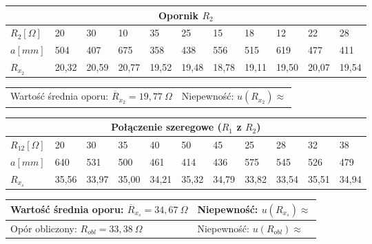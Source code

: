 \documentclass[a4paper,11pt]{article}
\begin{document}
\begin{table}[!ht]
\setlength{\extrarowheight}{5pt}
\centering
\begin{tabularx}{\textwidth}{XXXXXXXXXXX}

\multicolumn{11}{c}{\textbf{Opornik $R_2$}}\\        
\hline
$R_2[\Omega]$  &20	&30	&10	&35	&25	&15	&18	&12	&22	&28   \\
\hline
$a[mm]$  & 504 & 407 & 675 & 358 & 438 & 556 & 515 & 619	& 477 & 411 \\
\hline
$R_{x_2}$ &20,32 &20,59 &20,77 &19,52 &19,48 &18,78	&19,11	&19,50	&20,07	&19,54
\\    
\hline   
\end{tabularx}
\begin{tabularx}{\textwidth}{XX}
Wartość średnia oporu: $\overline{R}_{x_2}=19,77~\Omega $ & Niepewność: $u(R_{x_2})\approx $\\

\end{tabularx}
\end{table}


         
\begin{table}[!ht]
\setlength{\extrarowheight}{5pt}
\centering
\begin{tabularx}{\textwidth}{XXXXXXXXXXX}

\multicolumn{11}{c}{\textbf{Połączenie szeregowe ($R_1$ z $R_2$)}}\\        
\hline
$R_{12}[\Omega]$  & 20	&30	&35	&40	&50	&45	&25	&28	&32	&38 \\
\hline
$a[mm]$  & 640	&531 &500 &461 &414 &436 &575 &545 &526	&479 \\
\hline
$R_{x_s}$ & 35,56 & 33,97 & 35,00 & 34,21 & 35,32 & 34,79 & 33,82 & 33,54 & 35,51 & 34,94
\\    
\hline   
\end{tabularx}
\begin{tabularx}{\textwidth}{XX}
   
Wartość średnia oporu: $\overline{R}_{x_s}= 34,67~\Omega$ & Niepewność: $u(R_{x_s})\approx $ \\ \hline
Opór obliczony: $R_{obl} = 33,38~\Omega$ & Niepewność: $u(R_{obl})\approx $\\
\end{tabularx}
\end{table}
\end{document}

